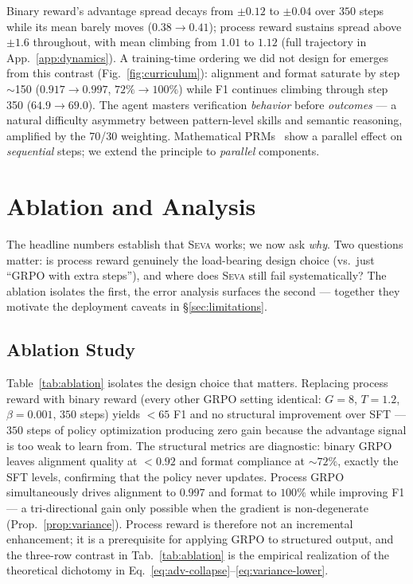 \documentclass{article}
\newcommand{\seva}{\textsc{Seva}\xspace}
\begin{document}
Binary reward's advantage spread decays from $\pm0.12$ to $\pm0.04$ over $350$ steps while its mean barely moves ($0.38\!\to\!0.41$); process reward sustains spread above $\pm1.6$ throughout, with mean climbing from $1.01$ to $1.12$ (full trajectory in App.~\ref{app:dynamics}).
A training-time ordering we did not design for emerges from this contrast (Fig.~\ref{fig:curriculum}): alignment and format saturate by step $\sim$150 ($0.917\!\to\!0.997$, $72\%\!\to\!100\%$) while F1 continues climbing through step 350 ($64.9\!\to\!69.0$).
The agent masters verification \emph{behavior} before \emph{outcomes} --- a natural difficulty asymmetry between pattern-level skills and semantic reasoning, amplified by the 70/30 weighting.
Mathematical PRMs~\citep{lightman2024lets} show a parallel effect on \emph{sequential} steps; we extend the principle to \emph{parallel} components.


\section{Ablation and Analysis}
\label{sec:analysis}

The headline numbers establish that \seva works; we now ask \emph{why}.
Two questions matter: is process reward genuinely the load-bearing design choice (vs.\ just ``GRPO with extra steps''), and where does \seva still fail systematically?
The ablation isolates the first, the error analysis surfaces the second --- together they motivate the deployment caveats in \S\ref{sec:limitations}.

\subsection{Ablation Study}

Table~\ref{tab:ablation} isolates the design choice that matters.
Replacing process reward with binary reward (every other GRPO setting identical: $G{=}8$, $T{=}1.2$, $\beta{=}0.001$, $350$ steps) yields $<\!65$ F1 and no structural improvement over SFT --- $350$ steps of policy optimization producing zero gain because the advantage signal is too weak to learn from.
The structural metrics are diagnostic: binary GRPO leaves alignment quality at $<0.92$ and format compliance at $\sim 72\%$, exactly the SFT levels, confirming that the policy never updates.
Process GRPO simultaneously drives alignment to $0.997$ and format to $100\%$ while improving F1 --- a tri-directional gain only possible when the gradient is non-degenerate (Prop.~\ref{prop:variance}).
Process reward is therefore not an incremental enhancement; it is a prerequisite for applying GRPO to structured output, and the three-row contrast in Tab.~\ref{tab:ablation} is the empirical realization of the theoretical dichotomy in Eq.~\ref{eq:adv-collapse}--\ref{eq:variance-lower}.
\end{document}
